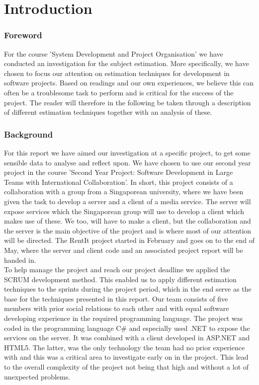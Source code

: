 \part{Introduction}
\section{Foreword}
For the course 'System Development and Project Organisation' we have conducted an investigation for the subject estimation. More specifically, we have chosen to focus our attention on estimation techniques for development in software projects. Based on readings and our own experiences, we believe this can often be a troublesome task to perform and is critical for the success of the project. The reader will therefore in the following be taken through a description of different estimation techniques together with an analysis of these. 

\section{Background}
For this report we have aimed our investigation at a specific project, to get some sensible data to analyse and reflect upon. We have chosen to use our second year project in the course 'Second Year Project: Software Development in Large Teams with International Collaboration'. In short, this project consists of a collaboration with a group from a Singaporean university, where we have been given the task to develop a server and a client of a media service. The server will expose services which the Singaporean group will use to develop a client which makes use of these. We too, will have to make a client, but the collaboration and the server is the main objective of the project and is where most of our attention will be directed. The RentIt project started in February and goes on to the end of May, where the server and client code and an associated project report will be handed in. \\

To help manage the project and reach our project deadline we applied the SCRUM development method. This enabled us to apply different estimation techniques to the sprints during the project period, which in the end serve as the base for the techniques presented in this report. Our team consists of five members with prior social relations to each other and with equal software developing experience in the required programming language. The project was coded in the programming language C\#\cite{cSharp_w} and especially used .NET\cite{.NET_w} to expose the services on the server. It was combined with a client developed in ASP.NET\cite{ASP.NET_w} and HTML5\cite{HTML5_w}. The latter, was the only technology the team had no prior experience with and this was a critical area to investigate early on in the project. This lead to the overall complexity of the project not being that high and without a lot of unexpected problems.\\

